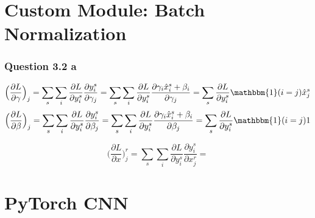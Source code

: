 \documentclass{article}
\begin{document}
\section{Custom Module: Batch Normalization}
\subsubsection*{Question 3.2 a}
\begin{equation}	
	\Big(\frac{\partial L}{\partial \gamma}\Big)_j = \sum_s \sum_i \frac{\partial L}{\partial y_i^s} \frac{\partial y_i^s}{\partial \gamma_j} = \sum_s \sum_i \frac{\partial L}{\partial y_i^s} \frac{\partial \gamma_i \hat{x}_i^s + \beta_i}{\partial \gamma_j} = \sum_s \frac{\partial L}{\partial y_i^s} \mathbbm{1}(i=j) \hat{x}_j^s
\end{equation}
\begin{equation}
	\Big(\frac{\partial L}{\partial \beta}\Big)_j = \sum_s \sum_i \frac{\partial L}{\partial y_i^s} \frac{\partial y_i^s}{\partial \beta_j} = \sum_s \sum_i \frac{\partial L}{\partial y_i^s} \frac{\partial \gamma_i \hat{x}_i^s + \beta_i}{\partial \beta_j} = \sum_s \frac{\partial L}{\partial y_i^s} \mathbbm{1}(i=j) 1
\end{equation}


\begin{equation}
	\Big(\frac{\partial L}{\partial x}\Big)_j^r = \sum_s \sum_i \frac{\partial L}{\partial y_i^s} \frac{\partial y_i^s}{\partial x_j^r} = 
\end{equation}



\section{PyTorch CNN}
\end{document}
